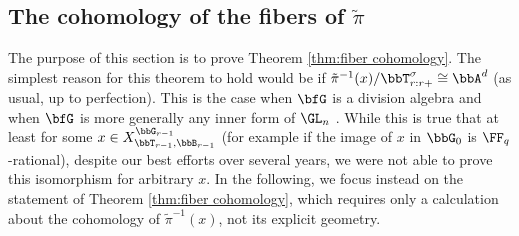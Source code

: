 \subsection{The cohomology of the fibers of $\tilde \pi$}\label{subsec:fiber cohomology}

The purpose of this section is to prove Theorem \ref{thm:fiber cohomology}. The simplest reason for this theorem to hold would be if $\tilde \pi^{-1}(x)/\bbT_{r:r+}^\sigma \cong \bbA^d$ (as usual, up to perfection). This is the case when $\bfG$ is a division algebra \cite[Lemma 4.7]{Boy12} and when $\bfG$ is more generally any inner form of $\GL_n$ \cite[Proposition 7.6]{CI21-MA}. While this is true that at least for some $x \in X_{\bbT_{r-1},\bbB_{r-1}}^{\bbG_{r-1}}$ (for example if the image of $x$ in $\bbG_0$ is $\FF_q$-rational), despite our best efforts over several years, we were not able to prove this isomorphism for arbitrary $x$. In the following, we focus instead on the statement of Theorem \ref{thm:fiber cohomology}, which requires only a calculation about the cohomology of $\tilde \pi^{-1}(x)$, not its explicit geometry.

